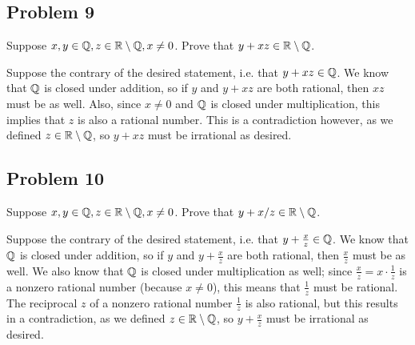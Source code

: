 \documentclass[main.tex]{subfiles}
\begin{document}
\subsection{Problem 9}
\begin{claim}
    Suppose $x, y \in\mathbb Q, z \in\mathbb R \setminus \mathbb Q, x \neq 0$. Prove that $y + xz \in\mathbb R \setminus \mathbb Q$.
\end{claim}

\begin{soln}
    Suppose the contrary of the desired statement, i.e. that $y + xz \in \mathbb Q$. We know that $\mathbb Q$ is closed under addition, so if $y$ and $y + xz$ are both rational, then $xz$ must be as well. Also, since $x\neq 0$ and $\mathbb Q$ is closed under multiplication, this implies that $z$ is also a rational number. This is a contradiction however, as we defined $z\in \mathbb R\setminus \mathbb Q$, so $y + xz$ must be irrational as desired.
\end{soln}
\eject

\subsection{Problem 10}
\begin{claim}
    Suppose $x,y \in\mathbb Q, z \in\mathbb R \setminus \mathbb Q, x \neq 0$. Prove that $y + x/z \in\mathbb R \setminus \mathbb Q$.
\end{claim}

\begin{soln}
    Suppose the contrary of the desired statement, i.e. that $y + \frac{x}{z} \in \mathbb Q$. We know that $\mathbb Q$ is closed under addition, so if $y$ and $y + \frac{x}{z}$ are both rational, then $\frac{x}{z}$ must be as well. We also know that $\mathbb Q$ is closed under multiplication as well; since $\frac{x}{z} = x \cdot \frac{1}{z}$ is a nonzero rational number (because $x\neq 0$), this means that $\frac{1}{z}$ must be rational. The reciprocal $z$ of a nonzero rational number $\frac{1}{z}$ is also rational, but this results in a contradiction, as we defined $z\in \mathbb R\setminus \mathbb Q$, so $y + \frac{x}{z}$ must be irrational as desired.
\end{soln}
\end{document}
